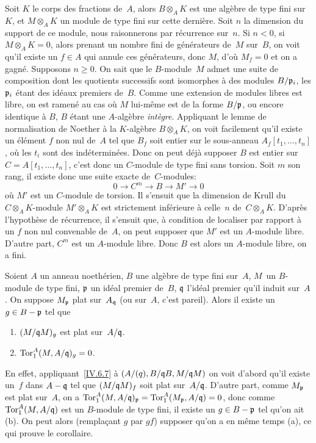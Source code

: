 Soit $K$ le corps des fractions de~$A$, alors $B\otimes_A K$ est une
alg\`ebre de type fini sur~$K$, et $M\otimes_A K$ un module de type
fini sur cette derni\`ere. Soit $n$ la dimension du support de ce
module, nous raisonnerons par r\'ecurrence sur~$n$.
Si $n<0$,
\ie si $M\otimes_A K=0$, alors prenant un nombre fini de
g\'en\'erateurs de~$M$ sur~$B$, on voit qu'il existe un $f\in A$
qui annule ces g\'en\'erateurs, donc $M$, d'o\`u $M_f=0$ et on a
gagn\'e. Supposons $n\ge 0$. On sait que le $B$-module~$M$ admet
une suite de composition dont les quotients successifs sont isomorphes
\`a des modules $B/\mathfrak{p}_i$, les $\mathfrak{p}_i$ \'etant des
id\'eaux premiers de~$B$. Comme une extension de modules libres est
libre, on est ramen\'e au cas o\`u $M$ lui-m\^eme est de la
forme $B/\mathfrak{p}$, ou encore identique \`a $B$, $B$ \'etant une
$A$-alg\`ebre \emph{intègre}. Appliquant le lemme de
normalisation de Noether \`a la $K$-alg\`ebre $B\otimes_A K$, on
voit facilement qu'il existe un \'el\'ement $f$ non nul de~$A$ tel
que $B_f$ soit entier sur le sous-anneau $A_f[t_1,\dots,t_n]$, o\`u
les $t_i$ sont des ind\'etermin\'ees. Donc on peut d\'ej\`a
supposer $B$ est entier sur~$C=A[t_1,\dots,t_n]$, c'est donc un
$C$-module de type fini sans torsion. Soit $m$ son rang, il existe
donc une suite exacte de~$C$-modules:
$$
0\to C^m\to B\to M'\to 0
$$
o\`u $M'$ est un $C$-module de torsion. Il s'ensuit que la
dimension de Krull du~$C\otimes_A K$-module $M'\otimes_A K$ est
strictement inf\'erieure \`a celle~$n$ de~$C\otimes_A K$.
D'apr\`es l'hypoth\`ese de r\'ecurrence, il s'ensuit que, \`a
condition de localiser par rapport \`a un $f$ non nul convenable
de~$A$, on peut supposer que $M'$ est un $A$-module
libre. D'autre part, $C^m$ est un $A$-module libre. Donc $B$ est
alors un $A$-module libre, on a fini.

\begin{lemme}
\label{IV.6.8}
Soient $A$ un anneau noeth\'erien, $B$ une alg\`ebre de type fini
sur~$A$, $M$~un $B$-module de type fini, $\mathfrak{p}$ un id\'eal
premier de~$B$, $\mathfrak{q}$ l'id\'eal premier qu'il induit sur~$A$. On suppose $M_\mathfrak{p}$ plat sur~$A_{\mathfrak{q}}$ (ou sur~$A$,
c'est pareil). Alors il existe un $g\in B-\mathfrak{p}$ tel que
\begin{enumerate}
\item[(a)] $(M/\mathfrak{q}M)_g$ est plat sur~$A/\mathfrak{q}$.
\item[(b)] $\operatorname{Tor}_1^A(M,A/\mathfrak{q})_g=0$.
\end{enumerate}
\end{lemme}
En effet, appliquant~\ref{IV.6.7} \`a $(A/\mathfrak(q), B/\mathfrak{q}B,
M/\mathfrak{q}M)$ on voit d'abord qu'il existe un~$f$ dans $A-\mathfrak{q}$
tel que $(M/\mathfrak{q}M)_f$ soit plat sur~$A/\mathfrak{q}$. D'autre part,
comme $M_\mathfrak{p}$ est plat sur~$A$, on a
$\operatorname{Tor}_1^A(M,A/\mathfrak{q})_\mathfrak{p}=\operatorname{Tor}_1^A(M_\mathfrak{p},A/\mathfrak{q})=0$,
donc comme $\operatorname{Tor}_1^A(M,A/\mathfrak{q})$ est un $B$-module de type fini, il
existe un $g\in B-\mathfrak{p}$ tel qu'on ait (b). On peut alors
(rempla\c cant $g$ par $gf$) supposer qu'on a en m\^eme temps (a),
ce qui prouve le corollaire.


